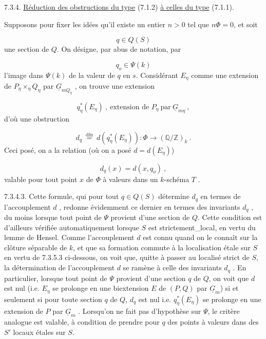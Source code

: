 

7.3.4.  \underline{Réduction des obstructions du type} (7.1.2) \underline{à celles du type} (7.1.1).

Supposons pour fixer les idées qu'il existe un entier $n > 0$ tel que $n \Phi = 0$, et soit

\begin{equation*}
q \in Q(S)
\end{equation*}
une section de $Q$. On désigne, par abus de notation, par

\begin{equation*}
q_o \in \Psi(k)
\end{equation*}
l'image dans $\Psi(k)$ de la valeur de $q$ en $s$. Considérant $E_\eta$ comme une extension de $P_\eta \times_\eta Q_\eta$ par $\underline{G}_{mQ_\eta}$ , on trouve une extension

\begin{equation*}
q^*_\eta(E_\eta) \ , \ \text{extension de } P_\eta \ \text{par} \ \underline{G}_{m\eta} \ ,
\end{equation*}
d'où une obstruction

\begin{equation}\tag{7.3.4.1}
d_q \ \overset{\mathrm{dfn}}{=} \ d(q^*_\eta(E_\eta)) : \Phi \longrightarrow (\mathbb{Q}/\mathbb{Z})_k \ .
\end{equation}
Ceci posé, on a la relation (où on a posé $d = d(E_\eta)$)

\begin{equation}\tag{7.3.4.2}
d_q(x) = d(x,q_o) \ ,
\end{equation}
valable pour tout point $x$ de $\Phi$ à valeurs dans un $k$-schéma $T$ .

7.3.4.3.  Cette formule, qui pour tout $q \in Q(S)$ détermine $d_q$ en termes de l'accouplement $d$ , redonne évidemment ce dernier en termes des invariants $d_q$ , du moins lorsque tout point de $\Psi$ provient d'une section de $Q$. Cette condition est d'ailleurs vérifiée automatiquement lorsque $S$ est strictement\_local, en vertu du lemme de Hensel. Comme l'accouplement $d$ est connu quand on le connaît sur la clôture séparable de $k$, et que sa formation commute à la localisation étale sur $S$ en vertu de 7.3.5.3
ci-dessous, on voit que, quitte à passer au localisé strict de $S$, la détermination de l'accouplement $d$ se ramène à celle des invariants $d_q$ . En particulier, lorsque tout point de $\Psi$ provient d'une section $q$ de $Q$, on voit que $d$ est nul (i.e. $E_\eta$ se prolonge en une biextension $E$ de $(P,Q)$ par $\underline{G}_m$) si et seulement si pour toute section $q$ de $Q$, $d_q$ est nul i.e. $q^*_\eta(E_\eta)$ se prolonge en une extension de $P$ par $\underline{G}_m$ . Lorsqu'on ne fait pas d'hypothèse sur $\Psi$, le critère analogue est valable, à condition de prendre pour $q$ des points à valeurs dans des $S'$ locaux étales sur $S$.

